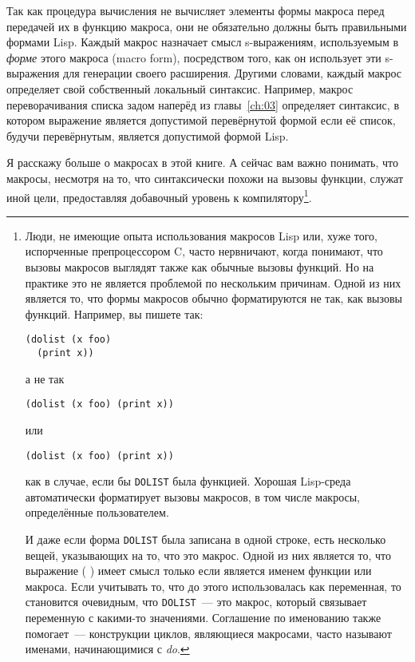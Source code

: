 Так как процедура вычисления не вычисляет элементы формы макроса перед передачей их в
функцию макроса, они не обязательно должны быть правильными формами Lisp. Каждый макрос
назначает смысл s-выражениям, используемым в \textit{форме} этого макроса (macro form),
посредством того, как он использует эти s-выражения для генерации своего
расширения. Другими словами, каждый макрос определяет свой собственный локальный
синтаксис. Например, макрос переворачивания списка задом наперёд из главы~\ref{ch:03} определяет
синтаксис, в котором выражение является допустимой перевёрнутой формой если её список,
будучи перевёрнутым, является допустимой формой Lisp.

Я расскажу больше о макросах в этой книге. А сейчас вам важно понимать, что макросы,
несмотря на то, что синтаксически похожи на вызовы функции, служат иной цели, предоставляя
добавочный уровень к компилятору\footnote{Люди, не имеющие опыта использования макросов
  Lisp или, хуже того, испорченные препроцессором C, часто нервничают, когда понимают, что
  вызовы макросов выглядят также как обычные вызовы функций. Но на практике это не
  является проблемой по нескольким причинам. Одной из них является то, что формы макросов
  обычно форматируются не так, как вызовы функций. Например, вы пишете так:

\begin{lstlisting}
(dolist (x foo)
  (print x))
\end{lstlisting}

\noindent{}а не так

\begin{lstlisting}
(dolist (x foo) (print x))
\end{lstlisting}

\noindent{}или 

\begin{lstlisting}
(dolist (x foo) (print x))
\end{lstlisting}

\noindent{}как в случае, если бы \lstinline{DOLIST} была функцией. Хорошая Lisp-среда автоматически
форматирует вызовы макросов, в том числе макросы, определённые пользователем.

И даже если форма \lstinline{DOLIST} была записана в одной строке, есть несколько вещей,
указывающих на то, что это макрос. Одной из них является то, что выражение (
) имеет смысл только если  является именем функции или макроса. Если
учитывать то, что до этого  использовалась как переменная, то становится
очевидным, что \lstinline{DOLIST}~--- это макрос, который связывает переменную  с
какими-то значениями. Соглашение по именованию также помогает~--- конструкции циклов,
являющиеся макросами, часто называют именами, начинающимися с \textit{do}.}.

